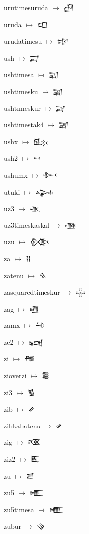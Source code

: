 {\noindent urutimesuruda $\mapsto$ {\cufont 𒍎}\par
\noindent uruda $\mapsto$ {\cufont 𒍏}\par
\noindent urudatimesu $\mapsto$ {\cufont 𒍐}\par
\noindent ush $\mapsto$ {\cufont 𒍑}\par
\noindent ushtimesa $\mapsto$ {\cufont 𒍒}\par
\noindent ushtimesku $\mapsto$ {\cufont 𒍓}\par
\noindent ushtimeskur $\mapsto$ {\cufont 𒍔}\par
\noindent ushtimestak4 $\mapsto$ {\cufont 𒍕}\par
\noindent ushx $\mapsto$ {\cufont 𒍖}\par
\noindent ush2 $\mapsto$ {\cufont 𒍗}\par
\noindent ushumx $\mapsto$ {\cufont 𒍘}\par
\noindent utuki $\mapsto$ {\cufont 𒍙}\par
\noindent uz3 $\mapsto$ {\cufont 𒍚}\par
\noindent uz3timeskaskal $\mapsto$ {\cufont 𒍛}\par
\noindent uzu $\mapsto$ {\cufont 𒍜}\par
\noindent za $\mapsto$ {\cufont 𒍝}\par
\noindent zatenu $\mapsto$ {\cufont 𒍞}\par
\noindent zasquaredtimeskur $\mapsto$ {\cufont 𒍟}\par
\noindent zag $\mapsto$ {\cufont 𒍠}\par
\noindent zamx $\mapsto$ {\cufont 𒍡}\par
\noindent ze2 $\mapsto$ {\cufont 𒍢}\par
\noindent zi $\mapsto$ {\cufont 𒍣}\par
\noindent zioverzi $\mapsto$ {\cufont 𒍤}\par
\noindent zi3 $\mapsto$ {\cufont 𒍥}\par
\noindent zib $\mapsto$ {\cufont 𒍦}\par
\noindent zibkabatenu $\mapsto$ {\cufont 𒍧}\par
\noindent zig $\mapsto$ {\cufont 𒍨}\par
\noindent ziz2 $\mapsto$ {\cufont 𒍩}\par
\noindent zu $\mapsto$ {\cufont 𒍪}\par
\noindent zu5 $\mapsto$ {\cufont 𒍫}\par
\noindent zu5timesa $\mapsto$ {\cufont 𒍬}\par
\noindent zubur $\mapsto$ {\cufont 𒍭}\par
}
